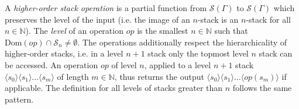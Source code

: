 \documentclass[a4paper,UKenglish,cleveref, autoref, thm-restate]{lipics-v2021}
\newcommand{\N}{\mathbb{N}}
\begin{document}
A {\em higher-order stack operation} is a partial function from $\mathscr{S}(\Gamma)$ 
to $\mathscr{S}(\Gamma)$ which preserves the level of the input (i.e. the image of
an $n$-stack is an $n$-stack for all $n \in \N$). The {\em level } of an operation $op$
is the smallest $n \in \N$ such that $\text{Dom}(op) \cap \mathscr{S}_n \neq \emptyset$. 
The operations 
additionally
 respect the hierarchicality of higher-order stacks, i.e. in
a level $n+1$ stack only the topmost level $n$ stack can be accessed. An operation
$op$ of level $n$, applied to a level $n+1$ stack 
$ \langle s_0 \rangle \langle s_1 \rangle \ldots \langle s_m \rangle$
of length $m \in \N$,
thus
returns the output
$ \langle s_0 \rangle \langle s_1 \rangle \ldots \langle op(s_m) \rangle$
if applicable.
The definition for  all levels of stacks greater than $n$ follows the same pattern.
\end{document}
